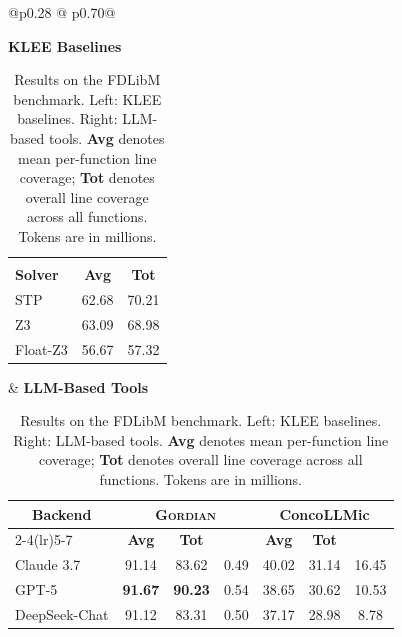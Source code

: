 \documentclass[acmsmall,screen,nonacm]{acmart}
\newcommand{\projName}{\textsc{Gordian}\xspace}
\theoremstyle{definition}
\begin{document}
\begin{table}[t!]
\centering
\caption{Results on the FDLibM benchmark.
Left: KLEE baselines.
Right: LLM-based tools.
\textbf{Avg} denotes mean per-function line coverage;
\textbf{Tot} denotes overall line coverage across all functions.
Tokens are in millions.}
\label{tab:FDLibM-summary}
\footnotesize
\vspace{-2mm}
\begin{tabular}{@{}p{}
@{\hspace{0.00\columnwidth}}
p{}@{}}

\raggedright
\centering\textbf{KLEE Baselines}\par\vspace{2pt}
\centering
\begin{tabular}{|l|cc|}
\toprule
\multicolumn{3}{|c|}{\rule{0pt}{3.2ex}} \\   %
\textbf{Solver}
& \textbf{Avg}
& \textbf{Tot} \\
\midrule
STP        & 62.68 & 70.21 \\
Z3         & 63.09 & 68.98 \\
Float-Z3   & 56.67 & 57.32 \\
\bottomrule
\end{tabular}

&
\centering\textbf{LLM-Based Tools}\par\vspace{2pt}
\centering
\begin{tabular}{|l|ccc|ccc|}
\toprule
\multicolumn{1}{|c|}{\textbf{Backend}}
& \multicolumn{3}{c|}{\textbf{\projName{}}}
& \multicolumn{3}{c|}{\textbf{ConcoLLMic}} \\
\cmidrule(lr){2-4}\cmidrule(lr){5-7}
& \textbf{Avg}
& \textbf{Tot}
& \makecell{\textbf{Tokens}}
& \textbf{Avg}
& \textbf{Tot}
& \makecell{\textbf{Tokens}} \\
\midrule
Claude 3.7
& 91.14 & 83.62 & 0.49
& 40.02 & 31.14 & 16.45 \\

GPT-5
& \textbf{91.67} & \textbf{90.23 } & 0.54
& 38.65 & 30.62 & 10.53 \\

DeepSeek-Chat
& 91.12 & 83.31 & 0.50
& 37.17 & 28.98 & 8.78 \\
\bottomrule
\end{tabular}
\end{tabular}
\vspace{-4mm}
\end{table}
\end{document}
